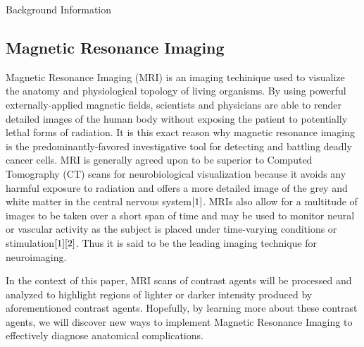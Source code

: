 \documentclass[a4paper,12pt]{article}
\begin{document}
\begin{section}{Background Information}

\subsection{Magnetic Resonance Imaging}
Magnetic Resonance Imaging (MRI) is an imaging techinique used to visualize the anatomy and physiological topology of living organisms. By using powerful externally-applied magnetic fields, scientists and physicians are able to render detailed images of the human body without exposing the patient to potentially lethal forms of radiation. It is this exact reason why magnetic resonance imaging is the predominantly-favored investigative tool for detecting and battling deadly cancer cells. MRI is generally agreed upon to be superior to Computed Tomography (CT) scans for neurobiological visualization because it avoids any harmful exposure to radiation and offers a more detailed image of the grey and white matter in the central nervous system$\cite{1}$.
MRIs also allow for a multitude of images to be taken over a short span of time and may be used to monitor neural or vascular activity as the subject is placed under time-varying conditions or stimulation$\cite{1}\cite{2}$.
Thus it is said to be the leading imaging technique for neuroimaging. \

In the context of this paper, MRI scans of contrast agents will be processed and analyzed to highlight regions of lighter or darker intensity produced by aforementioned contrast agents. Hopefully, by learning more about these contrast agents, we will discover new ways to implement Magnetic Resonance Imaging to effectively diagnose anatomical complications.


\newpage

\end{section}
\end{document}
